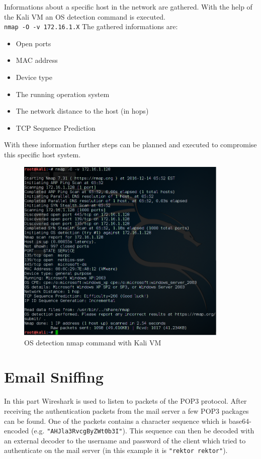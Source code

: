 Informations about a specific host in the network are gathered. With the help of the Kali VM an OS detection command is executed.\\
\texttt{nmap -O -v 172.16.1.X}
\newpage
The gathered informations are:
\begin{itemize}  
\item Open ports
\item MAC address
\item Device type
\item The running operation system 
\item The network distance to the host (in hops)
\item TCP Sequence Prediction
\end{itemize}
With these information further steps can be planned and executed to compromise this specific host system.

\begin{figure}[H]
	\centering
	\includegraphics[width=0.9\textwidth]{img/2_2_OS_Detection_Kali.PNG}
	\caption{OS detection nmap command with Kali VM}
	\label{img:os detection kali}
\end{figure}

\section{Email Sniffing}

In this part Wireshark is used to listen to packets of the \ac{POP3} protocol. After receiving the authentication packets from the mail server a few \ac{POP3} packages can be found. One of the packets contains a character sequence which is base64-encoded (e.g. \texttt{"AHJla3RvcgByZWt0b3I"}). This sequence can then be decoded with an external decoder to the username and password of the client which tried to authenticate on the mail server (in this example it is \texttt{"rektor rektor"}).

